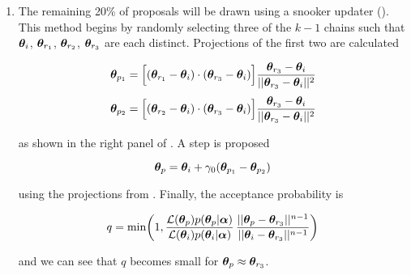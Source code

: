 \begin{enumerate}
\begin{enumerate}
\item \label{itm:update_demc_snooker} The remaining 20\% of proposals will be drawn using a snooker updater
().  This method begins by randomly selecting three of the
$k - 1$ chains such that $\boldsymbol{\theta}_i$, $\boldsymbol{\theta}_{r_1}$,
$\boldsymbol{\theta}_{r_2}$, $\boldsymbol{\theta}_{r_3}$ are each distinct.  Projections of the first two are calculated

\begin{subequations}
\begin{align}
\boldsymbol{\theta}_{p_1} = \Big[ (\boldsymbol{\theta}_{r_1} - \boldsymbol{\theta}_i) \cdot
(\boldsymbol{\theta}_{r_3} - \boldsymbol{\theta}_i) \Big]
\frac{\boldsymbol{\theta}_{r_3} - \boldsymbol{\theta}_i}{||\boldsymbol{\theta}_{r_3} - \boldsymbol{\theta}_i||^2}
\label{eq:elifetime_fit_mcmc_de_snooker_proj1}
\\[3pt]
\boldsymbol{\theta}_{p_2} = \Big[ (\boldsymbol{\theta}_{r_2} - \boldsymbol{\theta}_i) \cdot
(\boldsymbol{\theta}_{r_3} - \boldsymbol{\theta}_i) \Big]
\frac{\boldsymbol{\theta}_{r_3} - \boldsymbol{\theta}_i}{||\boldsymbol{\theta}_{r_3} - \boldsymbol{\theta}_i||^2}
\label{eq:elifetime_fit_mcmc_de_snooker_proj2}
\end{align}
\label{eq:elifetime_fit_mcmc_de_snooker_projs}
\end{subequations}

\noindent as shown in the right panel of .  A step is proposed

\begin{equation}
\boldsymbol{\theta}_p = \boldsymbol{\theta}_i + \gamma_0 (\boldsymbol{\theta}_{p_1} - \boldsymbol{\theta}_{p_2})
\label{eq:elifetime_fit_mcmc_update_snooker}
\end{equation}

\noindent using the projections from .  Finally, the acceptance probability is

\begin{equation}
q = \mathrm{min} \bigg( 1, \frac{\mathcal{L}(\boldsymbol{\theta}_p) p(\boldsymbol{\theta}_p|\boldsymbol{\alpha})}
{\mathcal{L}(\boldsymbol{\theta}_i) p(\boldsymbol{\theta}_i|\boldsymbol{\alpha})}
\, \frac{||\boldsymbol{\theta}_p - \boldsymbol{\theta}_{r_3}||^{n - 1}} {||\boldsymbol{\theta}_i - \boldsymbol{\theta}_{r_3}||^{n - 1}} \bigg)
\label{eq:elifetime_fit_mcmc_demc_snook_acc_prob}
\end{equation}

\noindent and we can see that $q$ becomes small for $\boldsymbol{\theta}_p \approx \boldsymbol{\theta}_{r_3}$.
\end{enumerate}


\end{enumerate}
